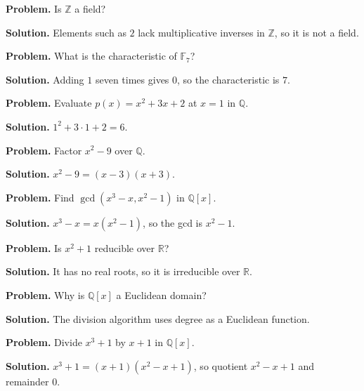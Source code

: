 \begin{example}\label{ex:sec1-1}
\textbf{Problem.} Is $\mathbb{Z}$ a field?

\textbf{Solution.} Elements such as $2$ lack multiplicative inverses in $\mathbb{Z}$, so it is not a field.
\end{example}

\begin{example}\label{ex:sec1-2}
\textbf{Problem.} What is the characteristic of $\mathbb{F}_7$?

\textbf{Solution.} Adding $1$ seven times gives $0$, so the characteristic is $7$.
\end{example}

\begin{example}\label{ex:sec1-3}
\textbf{Problem.} Evaluate $p(x)=x^2+3x+2$ at $x=1$ in $\mathbb{Q}$.

\textbf{Solution.} $1^2+3\cdot1+2=6$.
\end{example}

\begin{example}\label{ex:sec1-4}
\textbf{Problem.} Factor $x^2-9$ over $\mathbb{Q}$.

\textbf{Solution.} $x^2-9=(x-3)(x+3)$.
\end{example}

\begin{example}\label{ex:sec1-5}
\textbf{Problem.} Find $\gcd(x^3-x, x^2-1)$ in $\mathbb{Q}[x]$.

\textbf{Solution.} $x^3-x = x(x^2-1)$, so the gcd is $x^2-1$.
\end{example}

\begin{example}\label{ex:sec1-6}
\textbf{Problem.} Is $x^2+1$ reducible over $\mathbb{R}$?

\textbf{Solution.} It has no real roots, so it is irreducible over $\mathbb{R}$.
\end{example}

\begin{example}\label{ex:sec1-7}
\textbf{Problem.} Why is $\mathbb{Q}[x]$ a Euclidean domain?

\textbf{Solution.} The division algorithm uses degree as a Euclidean function.
\end{example}

\begin{example}\label{ex:sec1-8}
\textbf{Problem.} Divide $x^3+1$ by $x+1$ in $\mathbb{Q}[x]$.

\textbf{Solution.} $x^3+1=(x+1)(x^2-x+1)$, so quotient $x^2-x+1$ and remainder $0$.
\end{example}

